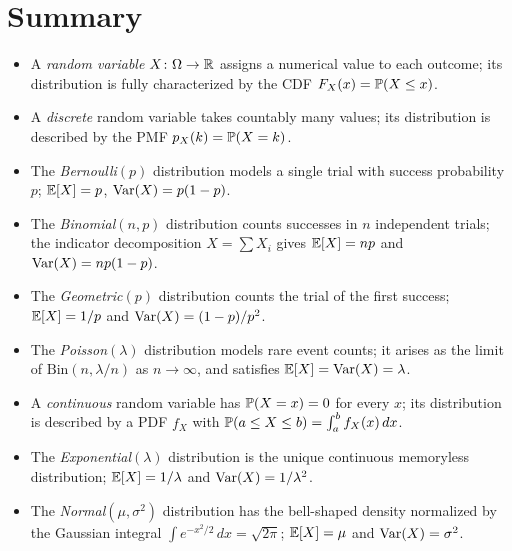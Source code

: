 \documentclass[11pt,a4paper]{article}
\begin{document}

\section{Summary}
\label{sec:summary}

\begin{itemize}
    \item A \emph{random variable} $X \colon \Omega \to \mathbb{R}$ assigns a
    numerical value to each outcome; its distribution is fully
    characterized by the CDF $F_X(x) = \mathbb{P}(X \leq x)$.
    \item A \emph{discrete} random variable takes countably many values;
    its distribution is described by the PMF
    $p_X(k) = \mathbb{P}(X = k)$.
    \item The \emph{Bernoulli}$(p)$ distribution models a single trial
    with success probability $p$; $\mathbb{E}[X] = p$, $\operatorname{Var}(X) = p(1-p)$.
    \item The \emph{Binomial}$(n, p)$ distribution counts successes in
    $n$ independent trials; the indicator decomposition
    $X = \sum X_i$ gives $\mathbb{E}[X] = np$ and $\operatorname{Var}(X) = np(1-p)$.
    \item The \emph{Geometric}$(p)$ distribution counts the trial of the
    first success; $\mathbb{E}[X] = 1/p$ and $\operatorname{Var}(X) = (1-p)/p^2$.
    \item The \emph{Poisson}$(\lambda)$ distribution models rare event
    counts; it arises as the limit of $\mathrm{Bin}(n, \lambda/n)$ as
    $n \to \infty$, and satisfies $\mathbb{E}[X] = \operatorname{Var}(X) = \lambda$.
    \item A \emph{continuous} random variable has
    $\mathbb{P}(X = x) = 0$ for every $x$; its distribution is described by
    a PDF $f_X$ with
    $\mathbb{P}(a \leq X \leq b) = \int_a^b f_X(x)\,dx$.
    \item The \emph{Exponential}$(\lambda)$ distribution is the unique
    continuous memoryless distribution; $\mathbb{E}[X] = 1/\lambda$ and
    $\operatorname{Var}(X) = 1/\lambda^2$.
    \item The \emph{Normal}$(\mu, \sigma^2)$ distribution has the
    bell-shaped density normalized by the Gaussian integral
    $\int e^{-x^2/2}\,dx = \sqrt{2\pi}$; $\mathbb{E}[X] = \mu$ and
    $\operatorname{Var}(X) = \sigma^2$.
\end{itemize}

\end{document}
